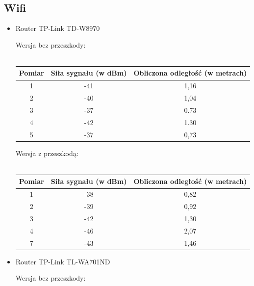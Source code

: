 \subsection{Wifi}
\begin{itemize}
	\item Router TP-Link TD-W8970
	\begin{center}
		\begin{minipage}{\linewidth}
			Wersja bez przeszkody:\\\\
			\begin{tabular}{|c|c|c|}
				\hline 
				Pomiar & Siła sygnału (w dBm) & Obliczona odległość (w metrach) \\ 
				\hline 
				1 & -41 & 1,16 \\ 
				\hline 
				2 & -40 & 1,04 \\ 
				\hline 
				3 & -37 & 0.73 \\ 
				\hline 
				4 & -42 & 1.30 \\ 
				\hline 
				5 & -37 & 0,73 \\ 
				\hline 
			\end{tabular} 
		\end{minipage} 
	\end{center}
	\begin{center}
		\begin{minipage}{\linewidth}
			Wersja z przeszkodą:\\\\
			\begin{tabular}{|c|c|c|}
				\hline 
				Pomiar & Siła sygnału (w dBm) & Obliczona odległość (w metrach) \\ 
				\hline 
				1 & -38 & 0,82 \\ 
				\hline 
				2 & -39 & 0,92 \\ 
				\hline 
				3 & -42 & 1,30 \\ 
				\hline 
				4 & -46 & 2,07 \\ 
				\hline 
				7 & -43 & 1,46 \\ 
				\hline 
			\end{tabular}				
		\end{minipage} 
	\end{center}
	\item Router TP-Link TL-WA701ND
	\begin{center}
		\begin{minipage}{\linewidth}
			Wersja bez przeszkody:\\\\
			\begin{tabular}{|c|c|c|}

\end{tabular}
\end{minipage}
\end{center}
\end{itemize}
